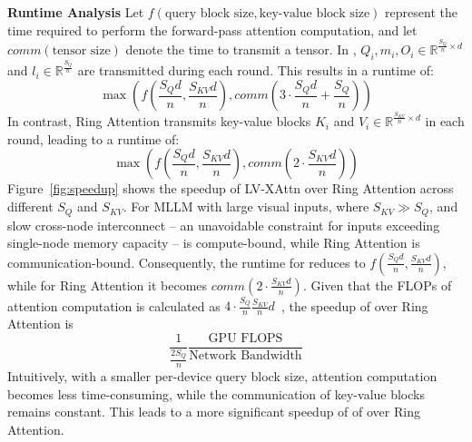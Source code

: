 \textbf{Runtime Analysis} Let $f(\text{query block size}, \text{key-value block size})$ represent the time required to perform the forward-pass attention computation, and let $comm(\text{tensor size})$ denote the time to transmit a tensor. In , $Q_i, m_i, O_i \in \mathbb{R}^{\frac{S_Q}{n} \times d}$ and $l_i \in \mathbb{R}^{\frac{S_Q}{n}}$ are transmitted during each round. This results in a runtime of:
\begin{equation}
    \max\left(f(\frac{S_Qd}{n}, \frac{S_{KV}d}{n}), comm(3\cdot\frac{S_Qd}{n} + \frac{S_Q}{n})\right)
\end{equation}
In contrast, Ring Attention transmits key-value blocks $K_i$ and $V_i \in \mathbb{R}^{\frac{S_{KV}}{n} \times d}$ in each round, leading to a runtime of:
\begin{equation}
    \max\left(f(\frac{S_Qd}{n}, \frac{S_{KV}d}{n}), comm(2\cdot\frac{S_{KV}d}{n})\right)
\end{equation}
Figure~\ref{fig:speedup} shows the speedup of LV-XAttn over Ring Attention across different $S_Q$ and $S_{KV}$. For MLLM with large visual inputs, where $S_{KV} \gg S_Q$, and slow cross-node interconnect -- an unavoidable constraint for inputs exceeding single-node memory capacity --  is compute-bound, while Ring Attention is communication-bound. Consequently, the runtime for  reduces to $f\left(\frac{S_Qd}{n}, \frac{S_{KV}d}{n}\right)$, while for Ring Attention it becomes $comm\left(2\cdot\frac{S_{KV}d}{n}\right)$. Given that the FLOPs of attention computation is calculated as $4\cdot\frac{S_Q}{n}\frac{S_{KV}}{n}d$~\cite{dao2023fa2}, the speedup of  over Ring Attention is 
\begin{equation}
\label{eqn:speedup}
\frac{1}{\frac{2S_Q}{n}}\frac{\text{GPU FLOPS}}{\text{Network Bandwidth}}
\end{equation}
Intuitively, with a smaller per-device query block size, attention computation becomes less time-consuming, while the communication of key-value blocks remains constant. This leads to a more significant speedup of of  over Ring Attention.


